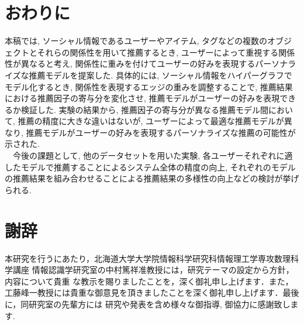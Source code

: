 \documentclass[a4j,11pt]{jarticle}           %
\begin{document}
	\section{おわりに}
	本稿では, ソーシャル情報であるユーザーやアイテム, タグなどの複数のオブジェクトとそれらの関係性を用いて推薦するとき, ユーザーによって重視する関係性が異なると考え, 
	関係性に重みを付けてユーザーの好みを表現するパーソナライズな推薦モデルを提案した. 具体的には, ソーシャル情報をハイパーグラフでモデル化するとき, 
	関係性を表現するエッジの重みを調整することで, 推薦結果における推薦因子の寄与分を変化させ, 推薦モデルがユーザーの好みを表現できるか検証した. 
	実験の結果から, 推薦因子の寄与分が異なる推薦モデル間において, 推薦の精度に大きな違いはないが, ユーザーによって最適な推薦モデルが異なり, 推薦モデルがユーザーの好みを表現するパーソナライズな推薦の可能性が示された. 
	\\　今後の課題として, 他のデータセットを用いた実験, 各ユーザーそれぞれに適したモデルで推薦することによるシステム全体の精度の向上, 
	それぞれのモデルの推薦結果を組み合わせることによる推薦結果の多様性の向上などの検討が挙げられる. 
	
	\newpage
	\section*{謝辞}
	本研究を行うにあたり，北海道大学大学院情報科学研究科情報理工学専攻数理科学講座
	情報認識学研究室の中村篤祥准教授には，研究テーマの設定から方針，内容について貴重
	な教示を賜りましたことを，深く御礼申し上げます．また，工藤峰一教授には貴重な御意見を頂きましたことを深く御礼申し上げます．最後に，同研究室の先輩方には
	研究や発表を含め様々な御指導, 御協力に感謝致します. 
	\newpage
	\small
		
\end{document}
